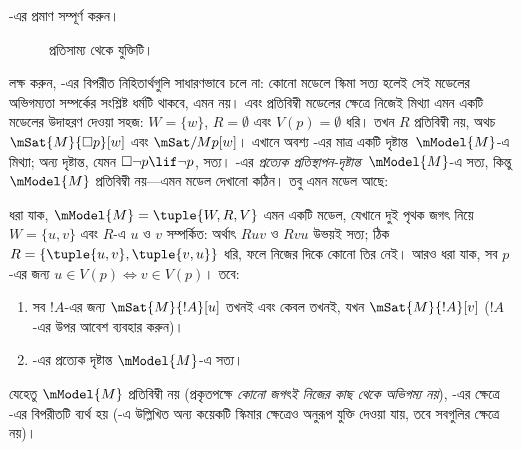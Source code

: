 \documentclass[../../../include/open-logic-section]{subfiles}
\begin{document}
\begin{prob}
  -এর প্রমাণ সম্পূর্ণ করুন।
\end{prob}

\begin{figure}
  \begin{center}
  \end{center}
\caption{প্রতিসাম্য থেকে যুক্তিটি।}
\end{figure}

লক্ষ করুন, -এর বিপরীত নিহিতার্থগুলি সাধারণভাবে চলে না: কোনো মডেলে স্কিমা সত্য হলেই সেই মডেলের অভিগম্যতা সম্পর্কের সংশ্লিষ্ট ধর্মটি থাকবে, এমন নয়।  এবং প্রতিবিম্বী মডেলের ক্ষেত্রে  নিজেই মিথ্যা এমন একটি মডেলের উদাহরণ দেওয়া সহজ: $W = \{w\}$, $R = \emptyset$ এবং $V(p) = \emptyset$ ধরি। তখন $R$ প্রতিবিম্বী নয়, অথচ $\mSat{M}{\Box
  p}[w]$ এবং $\mSat/{M}{p}[w]$। এখানে অবশ্য -এর মাত্র একটি দৃষ্টান্ত~$\mModel{M}$-এ মিথ্যা; অন্য দৃষ্টান্ত, যেমন $\Box \lnot p \lif \lnot p$, সত্য। -এর \emph{প্রত্যেক প্রতিস্থাপন-দৃষ্টান্ত}~$\mModel{M}$-এ সত্য, কিন্তু $\mModel{M}$ প্রতিবিম্বী নয়—এমন মডেল দেখানো কঠিন। তবু এমন মডেল আছে:

\begin{prop}
  ধরা যাক, $\mModel{M} = \tuple{W, R, V}$ এমন একটি মডেল, যেখানে দুই পৃথক জগৎ নিয়ে $W = \{u, v
  \}$ এবং $R$-এ $u$ ও $v$ সম্পর্কিত: অর্থাৎ $Ruv$ ও $Rvu$ উভয়ই সত্য; ঠিক $R = \{\tuple{u,v},\tuple{v,u}\}$ ধরি, ফলে নিজের দিকে কোনো তির নেই। আরও ধরা যাক, সব $p$-এর জন্য $u \in V(p) \Leftrightarrow v
  \in V(p)$। তবে:
  \begin{enumerate}
  \item সব $!A$-এর জন্য $\mSat{M}{!A}[u]$ তখনই এবং কেবল তখনই, যখন
    $\mSat{M}{!A}[v]$ ($!A$-এর উপর আবেশ ব্যবহার করুন)।
  \item {}-এর প্রত্যেক দৃষ্টান্ত $\mModel{M}$-এ সত্য।
  \end{enumerate}
  যেহেতু $\mModel{M}$ প্রতিবিম্বী নয় (প্রকৃতপক্ষে \emph{কোনো জগৎই নিজের কাছ থেকে অভিগম্য নয়}), -এর ক্ষেত্রে -এর বিপরীতটি ব্যর্থ হয় (-এ উল্লিখিত অন্য কয়েকটি স্কিমার ক্ষেত্রেও অনুরূপ যুক্তি দেওয়া যায়, তবে সবগুলির ক্ষেত্রে নয়)।
\end{prop}
\end{document}
